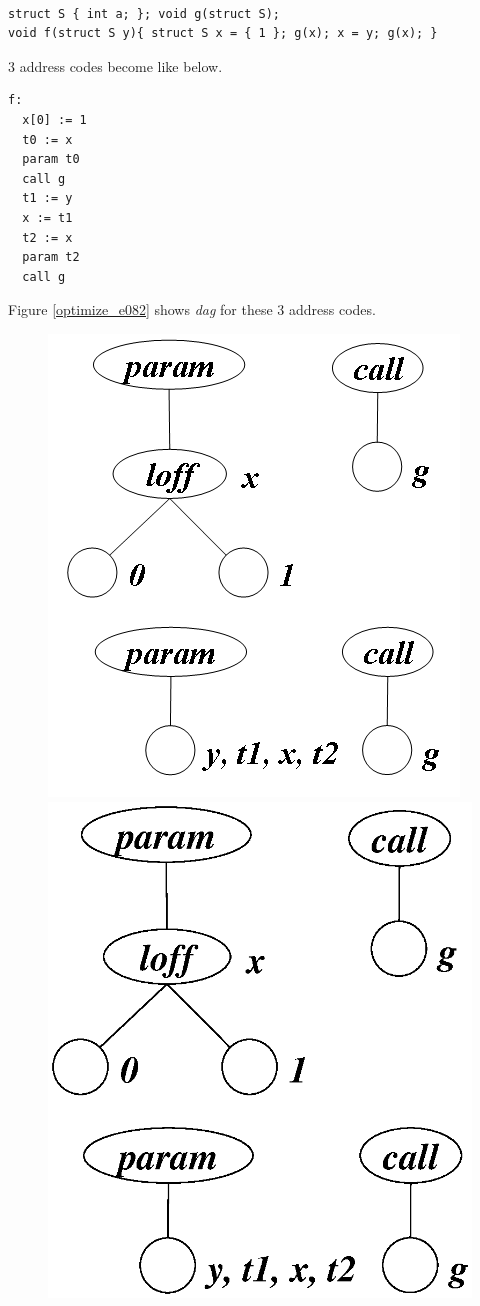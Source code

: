\begin{Example}
\label{optimize_e081}
\begin{verbatim}

struct S { int a; }; void g(struct S);
void f(struct S y){ struct S x = { 1 }; g(x); x = y; g(x); }
\end{verbatim}
3 address codes become like below.
\begin{verbatim}
f:
  x[0] := 1
  t0 := x
  param t0
  call g
  t1 := y
  x := t1
  t2 := x
  param t2
  call g
\end{verbatim}
Figure \ref{optimize_e082} shows {\em dag} for these 3 address codes.
\begin{figure}[htbp]
\begin{center}
\begin{htmlonly}
\includegraphics[width=0.493\linewidth,height=0.6\linewidth]{opt034.png}
\end{htmlonly}
\begin{latexonly}
\includegraphics[width=0.493\linewidth,height=0.6\linewidth]{opt034.eps}
\end{latexonly}

\end{center}
\end{figure}
\end{Example}
